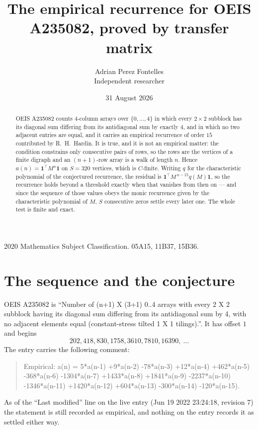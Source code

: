 \documentclass[11pt,a4paper]{article}
\title{The empirical recurrence for OEIS A235082, proved by transfer matrix}
\author{Adrian Perez Fontelles\\ \small Independent researcher}
\date{31 August 2026}
\theoremstyle{plain}
\theoremstyle{definition}
\begin{document}
\maketitle

\begin{abstract}
OEIS A235082 counts $4$-column arrays over $\{0,\dots,4\}$ in which every
$2\times2$ subblock has its diagonal sum differing from its antidiagonal sum by
exactly $4$, and in which no two adjacent entries are equal, and it
carries an empirical recurrence of order $15$ contributed by R.~H.~Hardin. It is true,
and it is not an empirical matter: the condition constrains only consecutive pairs of rows,
so the rows are the vertices of a finite digraph and an $(n+1)$-row array is a walk of
length $n$. Hence $a(n)=\mathbf{1}^{\!\top}M^{n}\mathbf{1}$ on $S=320$ vertices, which
is $C$-finite. Writing $q$ for the characteristic polynomial of the conjectured recurrence,
the residual is $\mathbf{1}^{\!\top}M^{\,n-15}q(M)\mathbf{1}$, so the recurrence
holds beyond a threshold exactly when that vanishes from then on --- and since the sequence
of those values obeys the monic recurrence given by the characteristic polynomial of $M$,
$S$ consecutive zeros settle every later one. The whole test is finite and exact.
\end{abstract}

\noindent\small 2020 Mathematics Subject Classification. 05A15, 11B37, 15B36.\normalsize

\section{The sequence and the conjecture}

OEIS A235082 is ``Number of (n+1) X (3+1) 0..4 arrays with every 2 X 2 subblock having its diagonal sum differing from its antidiagonal sum by 4, with no adjacent elements equal (constant-stress tilted 1 X 1 tilings).''. It has offset
$1$ and begins
\[
202, 418, 830, 1758, 3610, 7810, 16390,\ \dots
\]
The entry carries the following comment:
\begin{quote}\small
Empirical: a(n) = 5*a(n-1) +9*a(n-2) -78*a(n-3) +12*a(n-4) +462*a(n-5) -368*a(n-6) -1304*a(n-7) +1433*a(n-8) +1841*a(n-9) -2237*a(n-10) -1346*a(n-11) +1420*a(n-12) +604*a(n-13) -300*a(n-14) -120*a(n-15).
\end{quote}
As of the ``Last modified'' line on the live entry (Jun 19 2022 23:24:18, revision 7) the statement is
still recorded as empirical, and nothing on the entry records it as settled either way.
\end{document}
